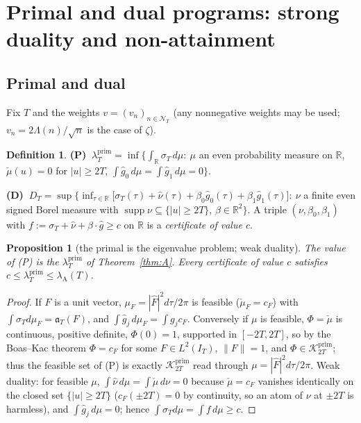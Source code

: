 \documentclass[11pt]{amsart}
\newtheorem{proposition}[theorem]{Proposition}
\theoremstyle{definition}
\newtheorem{definition}[theorem]{Definition}
\theoremstyle{remark}
\newcommand{\R}{\mathbb R}
\newcommand{\supp}{\operatorname{supp}}
\newcommand{\Kp}{\mathcal K^{\mathrm{prim}}_{2T}}
\newcommand{\IT}{I_T}
\newcommand{\lamP}{\lambda^{\mathrm{prim}}_T}
\newcommand{\lamA}{\lambda_{\mathrm A}(T)}
\newcommand{\sT}{\sigma_T}
\newcommand{\gh}[1]{\widehat g_{#1}}
\newcommand{\nuh}{\widehat\nu}
\newcommand{\Fh}{\widehat F}
\newcommand{\cF}{c_F}
\newcommand{\NT}{\mathcal N_T}
\begin{document}
\section{Primal and dual programs: strong duality and non-attainment}\label{sec:duality}

\subsection{Primal and dual}
Fix $T$ and the weights $v=(v_n)_{n\in\NT}$ (any nonnegative weights may be used; $v_n=2\Lambda(n)/\sqrt n$
is the case of $\zeta$).

\begin{definition}\label{def:PD}
\textbf{(P)} $\ \lamP=\inf\big\{\int_\R\sT\,d\mu:\ \mu$ an even probability measure on $\R$,
$\check\mu(u)=0$ for $|u|\ge2T$, $\int\gh0\,d\mu=\int\gh1\,d\mu=0\big\}$.

\textbf{(D)} $\ D_T=\sup\big\{\inf_{\tau\in\R}\big[\sT(\tau)+\nuh(\tau)+\beta_0\gh0(\tau)+\beta_1\gh1(\tau)\big]:\
\nu$ a finite even signed Borel measure with $\supp\nu\subseteq\{|u|\ge2T\}$, $\beta\in\R^2\big\}$.
A triple $(\nu,\beta_0,\beta_1)$ with $f:=\sT+\nuh+\beta\cdot\widehat g\ge c$ on $\R$ is a
\emph{certificate of value $c$}.
\end{definition}

\begin{proposition}[the primal is the eigenvalue problem; weak duality]\label{prop:weak}
The value of \textup{(P)} is the $\lamP$ of Theorem~\ref{thm:A}. Every certificate of value $c$
satisfies $c\le\lamP\le\lamA$.
\end{proposition}
\begin{proof}
If $F$ is a unit vector, $\mu_F=|\Fh|^2d\tau/2\pi$ is feasible ($\check\mu_F=\cF$) with
$\int\sT d\mu_F=\mathfrak a_T(F)$, and $\int\gh j\,d\mu_F=\int g_j\cF$. Conversely if $\mu$ is
feasible, $\Phi=\check\mu$ is continuous, positive definite, $\Phi(0)=1$, supported in $[-2T,2T]$,
so by the Boas--Kac theorem \cite{BoasKac1945} $\Phi=\cF$ for some $F\in L^2(\IT)$, $\|F\|=1$, and
$\Phi\in\Kp$; thus the feasible set of (P) is exactly $\Kp$ read through $\mu=|\Fh|^2d\tau/2\pi$.
Weak duality: for feasible $\mu$, $\int\nuh\,d\mu=\int\check\mu\,d\nu=0$ because $\check\mu=\cF$
vanishes identically on the closed set $\{|u|\ge2T\}$ ($\cF(\pm2T)=0$ by continuity, so an atom
of $\nu$ at $\pm2T$ is harmless), and $\int\gh j\,d\mu=0$; hence
$\int\sT d\mu=\int f\,d\mu\ge c$.
\end{proof}
\end{document}
